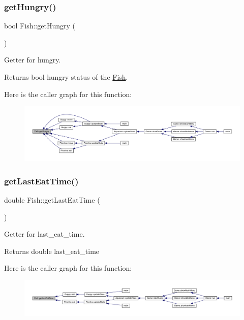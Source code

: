 \subsubsection{\texorpdfstring{get\+Hungry()}{getHungry()}}
{\footnotesize\ttfamily bool Fish\+::get\+Hungry (\begin{DoxyParamCaption}{ }\end{DoxyParamCaption})}



Getter for hungry. 

\begin{DoxyReturn}{Returns}
bool hungry status of the \mbox{\hyperlink{class_fish}{Fish}}. 
\end{DoxyReturn}
Here is the caller graph for this function\+:
\nopagebreak
\begin{figure}[H]
\begin{center}
\leavevmode
\includegraphics[width=350pt]{class_fish_aa4f43ec5e63aff8a1db32d530a91652d_icgraph}
\end{center}
\end{figure}
\mbox{\label{class_fish_a5cc60f7e97c95136c19d54b4e49a5262}} 
\subsubsection{\texorpdfstring{get\+Last\+Eat\+Time()}{getLastEatTime()}}
{\footnotesize\ttfamily double Fish\+::get\+Last\+Eat\+Time (\begin{DoxyParamCaption}{ }\end{DoxyParamCaption})}



Getter for last\+\_\+eat\+\_\+time. 

\begin{DoxyReturn}{Returns}
double last\+\_\+eat\+\_\+time 
\end{DoxyReturn}
Here is the caller graph for this function\+:
\nopagebreak
\begin{figure}[H]
\begin{center}
\leavevmode
\includegraphics[width=350pt]{class_fish_a5cc60f7e97c95136c19d54b4e49a5262_icgraph}
\end{center}
\end{figure}
\mbox{\label{class_fish_ab097bcfc0f0402bc1c9e048bf2351290}} 
